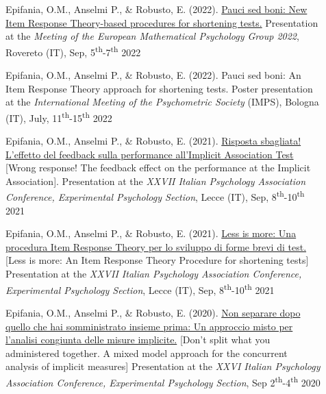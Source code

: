 \documentclass[letterpaper,12pt]{article}
\begin{document}
\begin{description}
		\item[] Epifania, O.M., Anselmi P., \& Robusto, E. (2022). \href{https://ottaviae.github.io/presentations/2022/presentationEpifania-empg.pdf}{Pauci sed boni: New Item Response Theory-based procedures for shortening tests.} Presentation at the \emph{Meeting of the European Mathematical Psychology Group 2022},  Rovereto (IT), Sep, 5\textsuperscript{th}-7\textsuperscript{th} 2022
	
	\item[] Epifania, O.M., Anselmi P., \& Robusto, E. (2022). Pauci sed boni: An Item Response Theory approach for shortening tests. Poster presentation at the \emph{International Meeting of the Psychometric Society} (IMPS), Bologna (IT), July, 11\textsuperscript{th}-15\textsuperscript{th} 2022
	
	\item[] Epifania, O.M., Anselmi P., \& Robusto, E. (2021). \href{https://ottaviae.github.io/presentations/2021/Risposta-sbagliata!.pdf}{Risposta sbagliata! L’effetto del feedback sulla performance all’Implicit Association Test} [Wrong response! The feedback effect on the performance at the Implicit Association]. Presentation at the \emph{XXVII Italian Psychology Association Conference, Experimental Psychology Section}, Lecce (IT), Sep, 8\textsuperscript{th}-10\textsuperscript{th} 2021
	
		\item[] Epifania, O.M., Anselmi P., \& Robusto, E. (2021). \href{https://ottaviae.github.io/presentations/2021/Less-is-more.pdf}{Less is more: Una procedura Item Response Theory per lo sviluppo di forme brevi di test.} [Less is more: An Item Response Theory Procedure for shortening tests] Presentation at the \emph{XXVII Italian Psychology Association Conference, Experimental Psychology Section}, Lecce (IT), Sep, 8\textsuperscript{th}-10\textsuperscript{th} 2021
		
		

	
	\item[] 	Epifania, O.M., Anselmi P., \& Robusto, E. (2020). \href{https://ottaviae.github.io/presentations/2020/EpifaniaSimposioS4.pdf}{Non separare dopo quello che hai somministrato insieme prima: Un approccio misto per l’analisi congiunta delle misure implicite.} [Don't split what you administered together. A mixed model approach for the concurrent analysis of implicit measures] Presentation at the \emph{XXVI Italian Psychology Association Conference, Experimental Psychology Section}, Sep 2\textsuperscript{th}-4\textsuperscript{th} 2020
	

\end{description}
\end{document}
